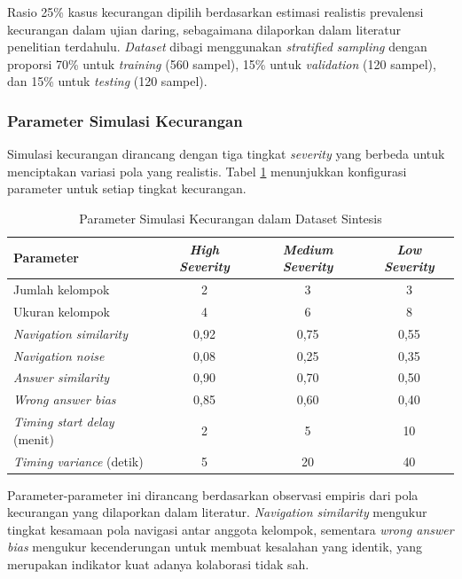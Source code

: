 Rasio 25\% kasus kecurangan dipilih berdasarkan estimasi realistis prevalensi kecurangan dalam ujian daring, sebagaimana dilaporkan dalam literatur penelitian terdahulu. \textit{Dataset} dibagi menggunakan \textit{stratified sampling} dengan proporsi 70\% untuk \textit{training} (560 sampel), 15\% untuk \textit{validation} (120 sampel), dan 15\% untuk \textit{testing} (120 sampel).

\subsubsection{Parameter Simulasi Kecurangan}

Simulasi kecurangan dirancang dengan tiga tingkat \textit{severity} yang berbeda untuk menciptakan variasi pola yang realistis. Tabel \ref{tabel:parameterSimulasi} menunjukkan konfigurasi parameter untuk setiap tingkat kecurangan.

\begin{table}[htbp]
\centering
\caption{Parameter Simulasi Kecurangan dalam Dataset Sintesis}
\label{tabel:parameterSimulasi}
\begin{tabular}{|l|c|c|c|}
\hline
\textbf{Parameter} & \textbf{\textit{High Severity}} & \textbf{\textit{Medium Severity}} & \textbf{\textit{Low Severity}} \\
\hline
Jumlah kelompok & 2 & 3 & 3 \\
\hline
Ukuran kelompok & 4 & 6 & 8 \\
\hline
\textit{Navigation similarity} & 0,92 & 0,75 & 0,55 \\
\hline
\textit{Navigation noise} & 0,08 & 0,25 & 0,35 \\
\hline
\textit{Answer similarity} & 0,90 & 0,70 & 0,50 \\
\hline
\textit{Wrong answer bias} & 0,85 & 0,60 & 0,40 \\
\hline
\textit{Timing start delay} (menit) & 2 & 5 & 10 \\
\hline
\textit{Timing variance} (detik) & 5 & 20 & 40 \\
\hline
\end{tabular}
\end{table}

Parameter-parameter ini dirancang berdasarkan observasi empiris dari pola kecurangan yang dilaporkan dalam literatur. \textit{Navigation similarity} mengukur tingkat kesamaan pola navigasi antar anggota kelompok, sementara \textit{wrong answer bias} mengukur kecenderungan untuk membuat kesalahan yang identik, yang merupakan indikator kuat adanya kolaborasi tidak sah.

